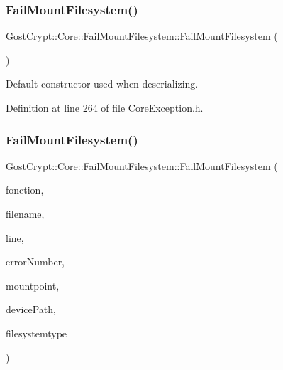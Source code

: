 \subsubsection{\texorpdfstring{Fail\+Mount\+Filesystem()}{FailMountFilesystem()}\hspace{0.1cm}{\footnotesize\ttfamily [1/2]}}
{\footnotesize\ttfamily Gost\+Crypt\+::\+Core\+::\+Fail\+Mount\+Filesystem\+::\+Fail\+Mount\+Filesystem (\begin{DoxyParamCaption}{ }\end{DoxyParamCaption})\hspace{0.3cm}{\ttfamily [inline]}}



Default constructor used when deserializing. 



Definition at line 264 of file Core\+Exception.\+h.

\mbox{\label{class_gost_crypt_1_1_core_1_1_fail_mount_filesystem_a137787821cb338fab75a390a147593d1}} 
\subsubsection{\texorpdfstring{Fail\+Mount\+Filesystem()}{FailMountFilesystem()}\hspace{0.1cm}{\footnotesize\ttfamily [2/2]}}
{\footnotesize\ttfamily Gost\+Crypt\+::\+Core\+::\+Fail\+Mount\+Filesystem\+::\+Fail\+Mount\+Filesystem (\begin{DoxyParamCaption}\item[{Q\+String}]{fonction,  }\item[{Q\+String}]{filename,  }\item[{quint32}]{line,  }\item[{quint32}]{error\+Number,  }\item[{Q\+File\+Info}]{mountpoint,  }\item[{Q\+File\+Info}]{device\+Path,  }\item[{Q\+String}]{filesystemtype }\end{DoxyParamCaption})\hspace{0.3cm}{\ttfamily [inline]}}



